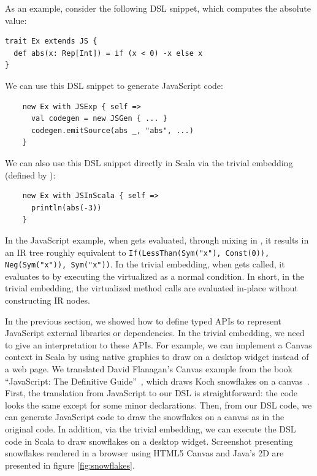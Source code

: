 \documentclass[runningheads,a4paper]{llncs}
\begin{document}
As an example, consider the following DSL snippet, which computes the absolute value:
\begin{lstlisting}
trait Ex extends JS {
  def abs(x: Rep[Int]) = if (x < 0) -x else x
}
\end{lstlisting}
We can use this DSL snippet to generate JavaScript code:
\begin{lstlisting}
    new Ex with JSExp { self =>
      val codegen = new JSGen { ... }
      codegen.emitSource(abs _, "abs", ...)
    }
\end{lstlisting}

We can also use this DSL snippet directly in Scala via the trivial embedding (defined by ):
\begin{lstlisting}
    new Ex with JSInScala { self =>
      println(abs(-3))
    }
\end{lstlisting}

In the JavaScript example, when  gets evaluated, through mixing in , it results in an IR tree roughly equivalent to {\tt\small If(LessThan(Sym("x"), Const(0)), Neg(Sym("x")), Sym("x"))}. In the trivial embedding, when  gets called, it evaluates to  by executing the virtualized  as a normal condition. In short, in the trivial embedding, the virtualized method calls are evaluated in-place without constructing IR nodes.

In the previous section, we showed how to define typed APIs to represent JavaScript external libraries or dependencies. In the trivial embedding, we need to give an interpretation to these APIs. For example, we can implement a Canvas context in Scala by using native graphics to draw on a desktop widget instead of a web page. We translated David Flanagan's Canvas example from the book ``JavaScript: The Definitive Guide''~\cite{flanagan}, which draws Koch snowflakes on a canvas~\cite{koch-code}. First, the translation from JavaScript to our DSL is straightforward: the code looks the same except for some minor declarations. Then, from our DSL code, we can generate JavaScript code to draw the snowflakes on a canvas as in the original code. In addition, via the trivial embedding, we can execute the DSL code in Scala to draw snowflakes on a desktop widget. Screenshot presenting snowflakes rendered in a browser using HTML5 Canvas and Java's 2D are presented in figure \ref{fig:snowflakes}.
\end{document}
